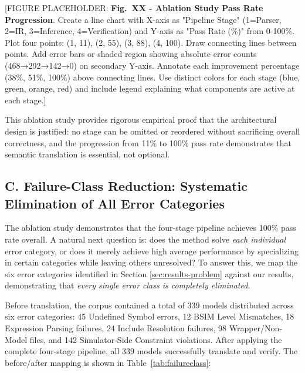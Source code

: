 \documentclass[conference]{IEEEtran}
\begin{document}
[FIGURE PLACEHOLDER: \textbf{Fig.~XX - Ablation Study Pass Rate Progression}. Create a line chart with X-axis as "Pipeline Stage" (1=Parser, 2=IR, 3=Inference, 4=Verification) and Y-axis as "Pass Rate (\%)" from 0-100\%. Plot four points: (1, 11), (2, 55), (3, 88), (4, 100). Draw connecting lines between points. Add error bars or shaded region showing absolute error counts (468→292→142→0) on secondary Y-axis. Annotate each improvement percentage (38\%, 51\%, 100\%) above connecting lines. Use distinct colors for each stage (blue, green, orange, red) and include legend explaining what components are active at each stage.]

This ablation study provides rigorous empirical proof that the architectural design is justified: no stage can be omitted or reordered without sacrificing overall correctness, and the progression from 11\% to 100\% pass rate demonstrates that semantic translation is essential, not optional.

\subsection{C. Failure-Class Reduction: Systematic Elimination of All Error Categories}
\label{sec:results-failureclass}

The ablation study demonstrates that the four-stage pipeline achieves 100\% pass rate overall. A natural next question is: does the method solve \textit{each individual} error category, or does it merely achieve high average performance by specializing in certain categories while leaving others unresolved? To answer this, we map the six error categories identified in Section \ref{sec:results-problem} against our results, demonstrating that \textit{every single error class is completely eliminated}.

Before translation, the corpus contained a total of 339 models distributed across six error categories: 45 Undefined Symbol errors, 12 BSIM Level Mismatches, 18 Expression Parsing failures, 24 Include Resolution failures, 98 Wrapper/Non-Model files, and 142 Simulator-Side Constraint violations. After applying the complete four-stage pipeline, all 339 models successfully translate and verify. The before/after mapping is shown in Table~\ref{tab:failureclass}:
\end{document}
